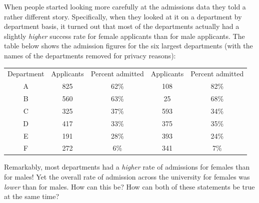\documentclass[
]{book}
\begin{document}
When people started looking more carefully at the admissions data \citep{Bickel1975} they told a rather different story. Specifically, when they looked at it on a department by department basis, it turned out that most of the departments actually had a slightly \emph{higher} success rate for female applicants than for male applicants. The table below shows the admission figures for the six largest departments (with the names of the departments removed for privacy reasons):

\begin{longtable}[]{@{}ccccc@{}}
\toprule
\endhead
Department & Applicants & Percent admitted & Applicants & Percent admitted\tabularnewline
A & 825 & 62\% & 108 & 82\%\tabularnewline
B & 560 & 63\% & 25 & 68\%\tabularnewline
C & 325 & 37\% & 593 & 34\%\tabularnewline
D & 417 & 33\% & 375 & 35\%\tabularnewline
E & 191 & 28\% & 393 & 24\%\tabularnewline
F & 272 & 6\% & 341 & 7\%\tabularnewline
\bottomrule
\end{longtable}

Remarkably, most departments had a \emph{higher} rate of admissions for females than for males! Yet the overall rate of admission across the university for females was \emph{lower} than for males. How can this be? How can both of these statements be true at the same time?
\end{document}
